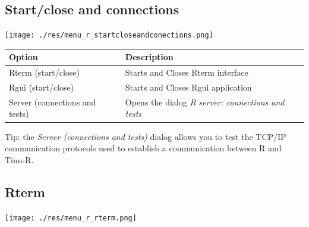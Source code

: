 \hypertarget{menu_r_startcloseandconections}{}
\subsection{Start/close and connections}

\texttt{[image: ./res/menu\_r\_startcloseandconections.png]}\\

\begin{scriptsize}\begin{tabularx}{\textwidth}{>{\hsize=0.5\hsize}X>{\hsize=0.7\hsize}X}\\
    \hline
    \textbf{Option} & \textbf{Description} \\
    \hline
    Rterm (start/close) & Starts and Closes Rterm interface \\
    Rgui (start/close) & Starts and Closes Rgui application \\
    Server (connections and tests) & Opens the dialog \textit{R server: connections and tests} \\
    \hline
  \end{tabularx}\end{scriptsize}

Tip: the \textit{Server (connections and tests)} dialog allows you to test the
TCP/IP communication protocols used to establish a communication between
R and Tinn-R.


\hypertarget{menu_r_rterm}{}
\subsection{Rterm}

\texttt{[image: ./res/menu\_r\_rterm.png]}\\

